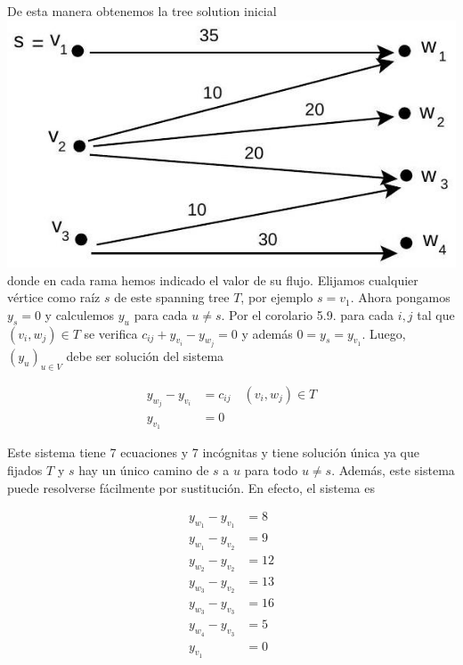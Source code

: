 \documentclass[10pt]{article}
\begin{document}
De esta manera obtenemos la tree solution inicial\\
\includegraphics[max width=\textwidth, center]{2025_09_05_955b52bfc43174a24a9ag-30}\\
donde en cada rama hemos indicado el valor de su flujo. Elijamos cualquier vértice como raíz $s$ de este spanning tree $T$, por ejemplo $s=v_{1}$. Ahora pongamos $y_{s}=0$ y calculemos $y_{u}$ para cada $u \neq s$. Por el corolario 5.9. para cada $i, j$ tal que $\left(v_{i}, w_{j}\right) \in T$ se verifica $c_{i j}+y_{v_{i}}-y_{w_{j}}=0$ y además $0=y_{s}=y_{v_{1}}$. Luego, $\left(y_{u}\right)_{u \in V}$ debe ser solución del sistema

$$
\begin{aligned}
y_{w_{j}}-y_{v_{i}} & =c_{i j} \quad\left(v_{i}, w_{j}\right) \in T \\
y_{v_{1}} & =0
\end{aligned}
$$

Este sistema tiene 7 ecuaciones y 7 incógnitas y tiene solución única ya que fijados $T$ y $s$ hay un único camino de $s$ a $u$ para todo $u \neq s$. Además, este sistema puede resolverse fácilmente por sustitución. En efecto, el sistema es

$$
\begin{aligned}
y_{w_{1}}-y_{v_{1}} & =8 \\
y_{w_{1}}-y_{v_{2}} & =9 \\
y_{w_{2}}-y_{v_{2}} & =12 \\
y_{w_{3}}-y_{v_{2}} & =13 \\
y_{w_{3}}-y_{v_{3}} & =16 \\
y_{w_{4}}-y_{v_{3}} & =5 \\
y_{v_{1}} & =0
\end{aligned}
$$
\end{document}
